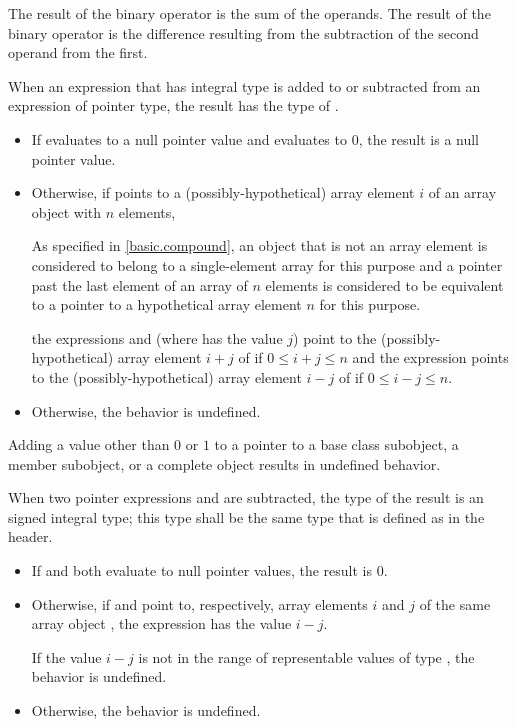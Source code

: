 \pnum
The result of the binary \tcode{+} operator is the sum of the operands.
The result of the binary \tcode{-} operator is the difference resulting
from the subtraction of the second operand from the first.

\pnum
{}%
When an expression  that has integral type
is added to or subtracted from an expression  of pointer type,
the result has the type of .
\begin{itemize}
\item If  evaluates to a null pointer value and
 evaluates to 0, the result is a null pointer value.
\item Otherwise, if  points to a (possibly-hypothetical) array element $i$
of an array object  with $n$ elements,
\begin{footnote}
As specified in \ref{basic.compound},
an object that is not an array element
is considered to belong to a single-element array for this purpose and
a pointer past the last element of an array of $n$ elements
is considered to be equivalent to a pointer to a hypothetical array element
$n$ for this purpose.
\end{footnote}
the expressions  and 
(where  has the value $j$)
point to the (possibly-hypothetical) array element
$i + j$ of  if $0 \le i + j \le n$
and the expression 
points to the (possibly-hypothetical) array element
$i - j$ of  if $0 \le i - j \le n$.
\item Otherwise, the behavior is undefined.
\end{itemize}
\begin{note}
Adding a value other than $0$ or $1$
to a pointer to a base class subobject, a member subobject,
or a complete object results in undefined behavior.
\end{note}

\pnum
{}%
%
%
%
When two pointer expressions  and  are subtracted,
the type of the result is an  signed
integral type; this type shall be the same type that is defined as
 in the 
header.
\begin{itemize}
\item If  and  both evaluate to null pointer values,
the result is 0.
\item Otherwise, if  and  point to, respectively,
array elements $i$ and $j$
of the same array object ,
the expression  has the value $i - j$.
\begin{note}
If the value $i - j$
is not in the range of representable values
of type ,
the behavior is undefined.
\end{note}
\item Otherwise, the behavior is undefined.
\end{itemize}

